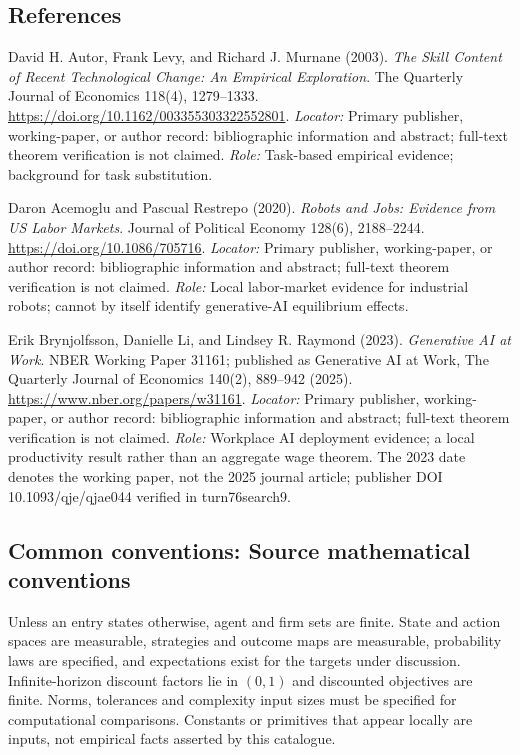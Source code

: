 \documentclass[11pt,a4paper]{article}
\begin{document}
\subsection*{References}
\begin{enumerate}[label=\textnormal{[S\arabic*]},leftmargin=*]
\item David H. Autor, Frank Levy, and Richard J. Murnane (2003). \emph{The Skill Content of Recent Technological Change: An Empirical Exploration}. The Quarterly Journal of Economics 118(4), 1279--1333. \url{https://doi.org/10.1162/003355303322552801}. \textit{Locator:} Primary publisher, working-paper, or author record: bibliographic information and abstract; full-text theorem verification is not claimed. \textit{Role:} Task-based empirical evidence; background for task substitution.
\item Daron Acemoglu and Pascual Restrepo (2020). \emph{Robots and Jobs: Evidence from US Labor Markets}. Journal of Political Economy 128(6), 2188--2244. \url{https://doi.org/10.1086/705716}. \textit{Locator:} Primary publisher, working-paper, or author record: bibliographic information and abstract; full-text theorem verification is not claimed. \textit{Role:} Local labor-market evidence for industrial robots; cannot by itself identify generative-AI equilibrium effects.
\item Erik Brynjolfsson, Danielle Li, and Lindsey R. Raymond (2023). \emph{Generative AI at Work}. NBER Working Paper 31161; published as Generative AI at Work, The Quarterly Journal of Economics 140(2), 889--942 (2025). \url{https://www.nber.org/papers/w31161}. \textit{Locator:} Primary publisher, working-paper, or author record: bibliographic information and abstract; full-text theorem verification is not claimed. \textit{Role:} Workplace AI deployment evidence; a local productivity result rather than an aggregate wage theorem. The 2023 date denotes the working paper, not the 2025 journal article; publisher DOI 10.1093/qje/qjae044 verified in turn76search9.
\end{enumerate}

\subsection*{Common conventions: Source mathematical conventions}

Unless an entry states otherwise, agent and firm sets are finite. State and action spaces are measurable, strategies and outcome maps are measurable, probability laws are specified, and expectations exist for the targets under discussion. Infinite-horizon discount factors lie in $(0,1)$ and discounted objectives are finite. Norms, tolerances and complexity input sizes must be specified for computational comparisons. Constants or primitives that appear locally are inputs, not empirical facts asserted by this catalogue.
\end{document}
